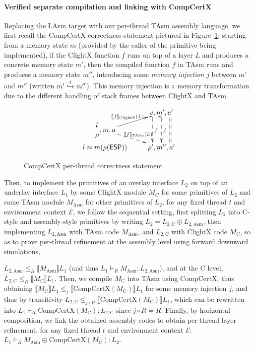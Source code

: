 \paragraph{Verified separate compilation and linking with CompCertX} 
Replacing  the LAsm target with our per-thread TAsm assembly
language, we first recall the CompCertX correctness statement
pictured in Figure~\ref{fig:compcertx}: starting from a memory state $m$
(provided by the caller of the primitive being implemented), if the
ClightX function $f$ runs on top of a layer $L$ and produces a
concrete memory state $m'$, then the compiled function $f$ in TAsm
runs and produces a memory state $m''$, introducing some \emph{memory
  injection} $j$ between $m'$ and $m''$ (written
$\inject{j}{m'}{m''}$). This memory injection is a memory
transformation \cite[\S 5.4]{leroy08} due to the different handling of
stack frames between ClightX and TAsm.


\begin{figure}
\[
\xymatrix@R=3pt@C+=3pt{
& v, m', a'
\ar@<-3ex>@{_{(}-->}[dd]^j
\ar@{_{(}-->}[dd]^j
\ar@<3ex>@{==}[dd]
\\
\genfrac{}{}{0pt}{0}{l}{\rho}, m, a
\ar[ur]^{\llbracket f \rrbracket_{\text{ClightX}}(L)}
\ar@{-->}[dr]^{ \llbracket f \rrbracket_{\text{TAsm}}(L)} \\
l \approx m(\rho(\textsf{ESP}))
& \rho', m'', a'
}
\]
\caption{CompCertX per-thread correctness statement} \label{fig:compcertx}
\hrulefill
\end{figure}

Then, to implement the primitives of an overlay interface $L_2$ on top
of an underlay interface $L_1$ by some ClightX module $M_C$ for some
primitives of $L_2$ and some TAsm module $M_{\text{Asm}}$ for other
primitives of $L_2$, for any fixed thread $t$ and environment context
$\mathcal E$, we follow the sequential setting, first splitting $L_2$ into C-style
and assembly-style primitives by writing $L_2 = L_{2, \text{C}} \oplus
L_{2, \text{Asm}}$, then implementing $L_{2, \text{Asm}}$ with TAsm
code $M_{\text{Asm}}$, and $L_{2, \text{C}}$ with ClightX code
$M_{\text{C}}$, so as to prove per-thread refinement at the assembly
level using forward downward simulations,
   $L_{2,
  \text{Asm}} \leqslant_R \llbracket M_{\text{Asm}} \rrbracket L_1$
(and thus $L_{1} \vdash_R M_{\text{Asm}} : L_{2, \text{Asm}}$), and at
the C level, $L_{2, \text{C}} \leqslant_R \llbracket M_{\text{C}}
\rrbracket L_1$. Then, we compile $M_{\text{C}}$ into TAsm using
CompCertX, thus obtaining $\llbracket M_{\text{C}} \rrbracket L_1
\leqslant_{j} \llbracket \text{CompCertX}(M_{\text{C}}) \rrbracket
L_1$ for some memory injection $j$, and thus by transitivity $L_{2,
  \text{C}} \leqslant_{j \circ R} \llbracket
\text{CompCertX}(M_{\text{C}}) \rrbracket L_1$, which can be rewritten
into $L_{1} \vdash_R \text{CompCertX}(M_{\text{C}}) : L_{2, \text{C}}$
since $j \circ R = R$. Finally, by horizontal composition, we link the
obtained assembly codes to obtain per-thread layer refinement, for any
fixed thread $t$ and environment context $\mathcal E$: $L_1 \vdash_R
M_{\text{Asm}} \oplus \text{CompCertX}(M_{\text{C}}) : L_2$.

